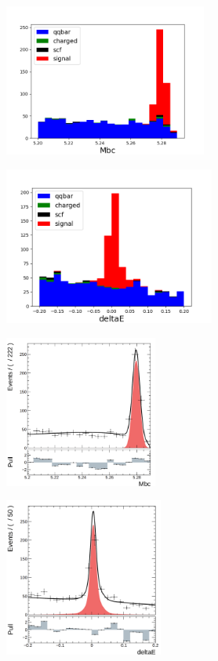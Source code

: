 \begin{figure}[H]
	\begin{minipage}[b]{0.5\linewidth}
		\centering 
		\includegraphics[height=5cm]{figures/hist_stacked_generic_mbc}
		\label{}
	\end{minipage}
	\begin{minipage}[b]{0.5\linewidth}
		\centering 
		\includegraphics[height=5.2cm]{figures/hist_stacked_generic_dE}
		\label{}
	\end{minipage}
	\begin{minipage}[b]{0.5\linewidth}
		\centering 
		\includegraphics[height=5cm]{figures/mbc-hist-2d}
		\label{}
	\end{minipage}
	\begin{minipage}[b]{0.5\linewidth}
		\centering 
		\includegraphics[height=5.2cm]{figures/dE-hist-2d}

\end{minipage}
\end{figure}
